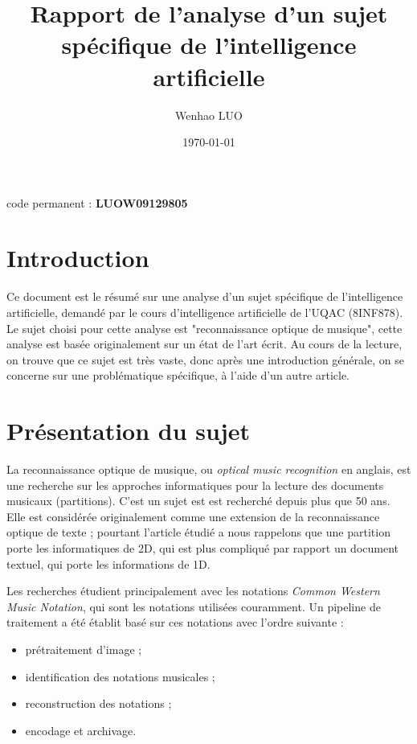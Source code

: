 \documentclass{article}
\author{Wenhao LUO}
\date{\today}
\title{Rapport de l'analyse d'un sujet spécifique de l'intelligence artificielle}
\begin{document}
\maketitle
\begin{center}
    code permanent : \textbf{LUOW09129805}
\end{center}
\newpage

\section{Introduction}
\par Ce document est le résumé sur une analyse d'un sujet spécifique de l'intelligence artificielle, demandé par le cours d'intelligence artificielle de l'UQAC (8INF878). Le sujet choisi pour cette analyse est "reconnaissance optique de musique", cette analyse est basée originalement sur un état de l'art écrit\cite{shatri2020optical}. Au cours de la lecture, on trouve que ce sujet est très vaste, donc après une introduction générale, on se concerne sur une problématique spécifique, à l'aide d'un autre article\cite{dos2009staff}.

\section{Présentation du sujet}
\par La reconnaissance optique de musique, ou \textit{optical music recognition} en anglais, est une recherche sur les approches informatiques pour la lecture des documents musicaux (partitions). C'est un sujet est est recherché depuis plus que 50 ans. Elle est considérée originalement comme une extension de la reconnaissance optique de texte ; pourtant l'article étudié a nous rappelons que une partition porte les informatiques de 2D, qui est plus compliqué par rapport un document textuel, qui porte les informations de 1D.

\par Les recherches étudient principalement avec les notations \textit{Common Western Music Notation}, qui sont les notations utilisées couramment. Un pipeline de traitement a été établit basé sur ces notations avec l'ordre suivante :
\begin{itemize}
    \item prétraitement d'image ;
    \item identification des notations musicales ;
    \item reconstruction des notations ;
    \item encodage et archivage.
\end{itemize}
\end{document}
